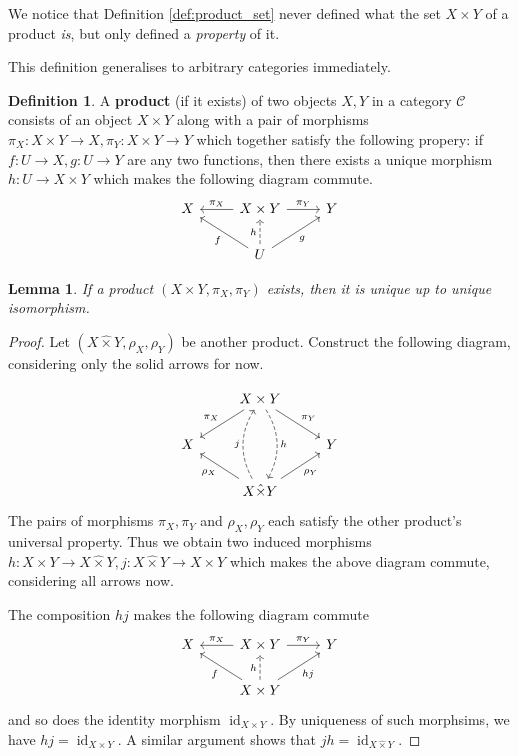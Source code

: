 \documentclass[12pt]{article}
\theoremstyle{plain}
\newtheorem{lemma}[thm]{Lemma}
\theoremstyle{definition}
\newtheorem{defn}[thm]{Definition} %
\newcommand{\scr}[1]{\mathscr{#1}}
\newcommand{\lto}{\longrightarrow}
\begin{document}
We notice that Definition \ref{def:product_set} never defined what the set $X \times Y$ of a product \emph{is}, but only defined a \emph{property} of it.

This definition generalises to arbitrary categories immediately.

\begin{defn}
	A \textbf{product} (if it exists) of two objects $X, Y$ in a category $\scr{C}$ consists of an object $X \times Y$ along with a pair of morphisms $\pi_X: X \times Y \lto X, \pi_Y: X \times Y \lto Y$ which together satisfy the following propery: if $f: U \lto X, g: U \lto Y$ are any two functions, then there exists a unique morphism $h: U \lto X \times Y$ which makes the following diagram commute.
		\begin{equation}
		\begin{tikzcd}
			X & X \times Y\arrow[l,swap,"{\pi_X}"]\arrow[r,"{\pi_Y}"] & Y\\
			& U\arrow[ul,"{f}"]\arrow[ur,swap,"{g}"]\arrow[u,dashed,"{h}"]
		\end{tikzcd}
	\end{equation}
	\end{defn}

\begin{lemma}
	If a product $(X \times Y, \pi_X, \pi_Y)$ exists, then it is unique up to unique isomorphism.
\end{lemma}
\begin{proof}
Let $(X \hat{\times} Y, \rho_X, \rho_Y)$ be another product. Construct the following diagram, considering only the solid arrows for now.

\begin{equation}
	\begin{tikzcd}
		& X \times Y\arrow[dl,swap,"{\pi_X}"]\arrow[dr,"{\pi_Y}"]\arrow[dd,dashed,bend left, "{h}"]\\
			X & & Y\\
			& X {\hat{\times}} Y\arrow[ul, "{\rho_X}"]\arrow[ur,swap,"{\rho_Y}"]\arrow[uu, bend left, dashed, "{j}"]
		\end{tikzcd}
	\end{equation}
	The pairs of morphisms $\pi_X, \pi_Y$ and $\rho_X, \rho_Y$ each satisfy the other product's universal property. Thus we obtain two induced morphisms $h: X \times Y\lto X \hat{\times} Y, j: X \hat{\times} Y \lto X \times Y$ which makes the above diagram commute, considering all arrows now.
	
	The composition $h j$ makes the following diagram commute
	\begin{equation}
		\begin{tikzcd}
			X & X \times Y\arrow[l,swap,"{\pi_X}"]\arrow[r,"{\pi_Y}"] & Y\\
			& X \times Y\arrow[ul,"{f}"]\arrow[ur,swap,"{h j}"]\arrow[u,dashed,"{h}"]
		\end{tikzcd}
	\end{equation}
and so does the identity morphism $\operatorname{id}_{X \times Y}$. By uniqueness of such morphsims, we have $hj = \operatorname{id}_{X \times Y}$. A similar argument shows that $jh = \operatorname{id}_{X \hat{\times} Y}$.
\end{proof}
\end{document}
